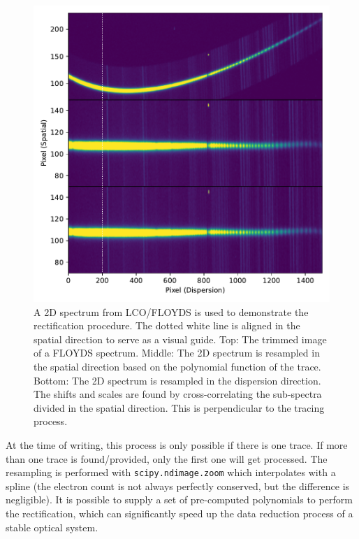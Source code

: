 \documentclass[twocolumn, linenumbers]{aastex631}
\begin{document}
\begin{figure}
    \centering
    \includegraphics[width=\columnwidth]{fig_02_rectification.pdf}
    \caption{A 2D spectrum from LCO/FLOYDS is used to
    demonstrate the rectification procedure. The dotted white line
    is aligned in the spatial direction to serve as a visual guide.
    Top: The trimmed image of a FLOYDS spectrum. Middle: The 2D
    spectrum is resampled in the spatial direction based on the
    polynomial function of the trace. Bottom: The 2D spectrum is
    resampled in the dispersion direction. The shifts and scales
    are found by cross-correlating the sub-spectra divided in the
    spatial direction. This is perpendicular to the tracing process.}
    \label{fig:rectify}
\end{figure}

At the time of writing, this process is only possible if there is
one trace. If more than one trace is found/provided, only the first
one will get processed. The resampling is performed with
\texttt{scipy.ndimage.zoom} which interpolates with a spline (the
electron count is not always perfectly conserved, but the difference
is negligible). It is possible to supply a set of pre-computed polynomials to perform
the rectification, which can significantly speed up the data reduction
process of a stable optical system.
\end{document}
